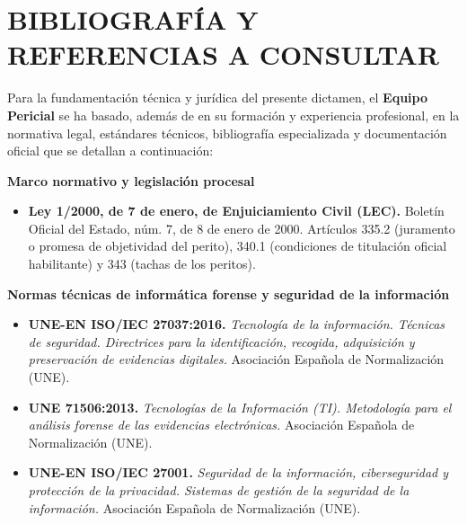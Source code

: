 \section{BIBLIOGRAFÍA Y REFERENCIAS A CONSULTAR}

Para la fundamentación técnica y jurídica del presente dictamen, el \textbf{Equipo Pericial \GrupoPracticas} se ha basado, además de en su formación y experiencia profesional, en la normativa legal, estándares técnicos, bibliografía especializada y documentación oficial que se detallan a continuación:

\textbf{Marco normativo y legislación procesal}
\begin{itemize}[leftmargin=1.5em, itemsep=0.35em]
	\item \textbf{Ley 1/2000, de 7 de enero, de Enjuiciamiento Civil (LEC).} Boletín Oficial del Estado, núm. 7, de 8 de enero de 2000. Artículos 335.2 (juramento o promesa de objetividad del perito), 340.1 (condiciones de titulación oficial habilitante) y 343 (tachas de los peritos).
\end{itemize}

\textbf{Normas técnicas de informática forense y seguridad de la información}
\begin{itemize}[leftmargin=1.5em, itemsep=0.35em]
	\item \textbf{UNE-EN ISO/IEC 27037:2016.} \textit{Tecnología de la información. Técnicas de seguridad. Directrices para la identificación, recogida, adquisición y preservación de evidencias digitales.} Asociación Española de Normalización (UNE).
	\item \textbf{UNE 71506:2013.} \textit{Tecnologías de la Información (TI). Metodología para el análisis forense de las evidencias electrónicas.} Asociación Española de Normalización (UNE).
	\item \textbf{UNE-EN ISO/IEC 27001.} \textit{Seguridad de la información, ciberseguridad y protección de la privacidad. Sistemas de gestión de la seguridad de la información.} Asociación Española de Normalización (UNE).
\end{itemize}

